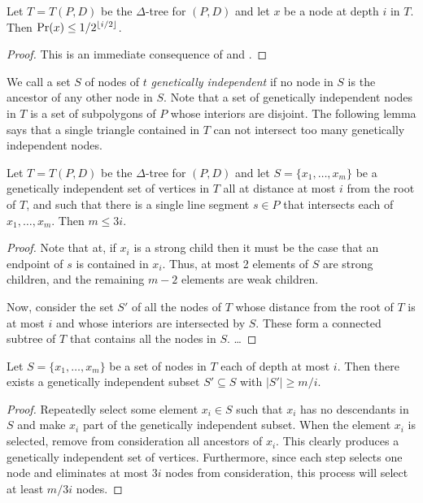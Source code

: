 \documentclass[lotsofwhite]{patmorin}
\begin{document}
\begin{lem}
Let $T=T(P,D)$ be the $\Delta$-tree for $(P,D)$ and
let $x$ be a node at depth $i$ in $T$.  Then $\Pr(x)\le 1/2^{\left\lfloor i/2 \right\rfloor}$.
\end{lem}

\begin{proof}
This is an immediate consequence of  and
.
\end{proof}

We call a set $S$ of nodes of $t$ \emph{genetically independent} if no
node in $S$ is the ancestor of any other node in $S$.  Note that a set
of genetically independent nodes in $T$ is a set of subpolygons of $P$
whose interiors are disjoint.  The following lemma says that a single
triangle contained in $T$ can not intersect too many genetically
independent nodes.  

\begin{lem}
Let $T=T(P,D)$ be the $\Delta$-tree for $(P,D)$ and let
$S=\{x_1,\ldots,x_m\}$ be a genetically independent set of vertices in
$T$ all at distance at most $i$ from the root of $T$, and such that
there is a single line segment $s\in P$ that intersects each of
$x_1,\ldots,x_m$.  Then $m\le 3i$.
\end{lem}

\begin{proof}
Note that at, if $x_i$ is a strong child then it must be the case that
an endpoint of $s$ is contained in $x_i$.  Thus, at most 2 elements
of $S$ are strong children, and the remaining $m-2$ elements are weak
children.

Now, consider the set $S'$ of all the nodes of $T$ whose distance from
the root of $T$ is at most $i$ and whose interiors are intersected by
$S$.  These form a connected subtree of $T$ that contains all the
nodes in $S$. \ldots
\end{proof}

\begin{lem}
Let $S=\{x_1,\ldots,x_m\}$ be a set of nodes in $T$ each of depth at
most $i$.  Then there exists a genetically independent subset
$S'\subseteq S$ with $|S'|\ge m/i$.
\end{lem}

\begin{proof}
Repeatedly select some element $x_i\in S$ such that $x_i$ has no
descendants in $S$ and make $x_i$ part of the genetically independent
subset.  When the element $x_i$ is selected, remove from consideration
all ancestors of $x_i$.  This clearly produces a genetically
independent set of vertices.  Furthermore, since each step selects one
node and eliminates at most $3i$ nodes from consideration, this
process will select at least $m/3i$ nodes.
\end{proof}
\end{document}
